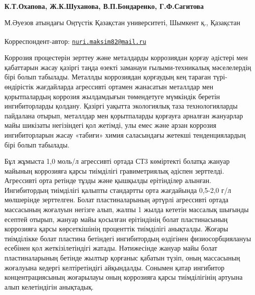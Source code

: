
\begin{articleheader}


{\bfseries К.Т.Охапова\textsuperscript{\envelope }, Ж.К.Шуханова, В.П.Бондаренко,
Г.Ф.Сагитова}
\end{articleheader}
\begin{affiliation}

М.Әуезов атындағы Оңтүстік Қазақстан университеті, Шымкент қ., Қазақстан

\raggedright {\bfseries \textsuperscript{\envelope }}Корреспондент-автор:
\href{mailto:nuri.maksim82@mail.ru}{\nolinkurl{nuri.maksim82@mail.ru}}
\end{affiliation}

Коррозия процестерін зерттеу және металдарды коррозиядан қорғау әдістері
мен қабаттарын жасау қазіргі таңда өзекті заманауи ғылыми-техникалық
мәселелердің бірі болып табылады. Металлды коррозиядан қорғаудың кең
тараған түрі- өндірістік жағдайларда агрессивті ортамен жанасатын
металлдар мен қорытпалардың коррозия жылдамдығын төмендетуге мүмкіндік
беретін ингибиторларды қолдану. Қазіргі уақытта экологиялық таза
технологияларды пайдалана отырып, металлдар мен қорытпаларды қорғауға
арналған жануарлар майы шикізаты негізіндегі қол жетімді, улы емес және
арзан коррозия ингибиторларын жасау «табиғи» химия саласындағы жетекші
тенденциялардың бірі болып табылады.

Бұл жұмыста 1,0 моль/л агрессивті ортада СТ3 көміртекті болатқа жануар
майының коррозияға қарсы тиімділігі гравиметриялық әдіспен зерттелді.
Агрессивті орта ретінде тұзды және қышқылды ерітінділер алынған.
Ингибитордың тиімділігі қалыпты стандартты орта жағдайында 0,5-2,0 г/л
мөлшерінде зерттелген. Болат пластиналарының әртүрлі агрессивті ортада
массасының жоғалуын негізге алып, жалпы 1 жылда кететін массалық шығынды
есептей отырып, жануар майы қосылған ерітіндінің болат пластинасының
коррозияға қарсы көрсеткішінің проценттік тиімділігі анықталды. Жоғары
тиімділікке болат пластина бетіндегі ингибитордың өздігінен
физиосорбциялануы есебінен қол жеткізілетіндігі жатады. Нәтижесінде
жануар майы болат пластиналарының бетінде жылтыр қорғаныс қабатын түзіп,
оның массасының жоғалуына кедергі келтіретіндігі айқындалды. Сонымен
қатар ингибитор концентрациясының жоғарылауы оның коррозияға қарсы
тиімділігінің артуына алып келетіндігін анықтадық.

